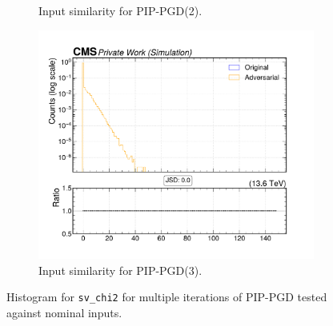 \begin{figure}[htbp]
\begin{subfigure}[t]{0.32\textwidth}
    \caption*{Input similarity for PIP-PGD(2).}
  \end{subfigure}\hfill
  \begin{subfigure}[t]{0.32\textwidth}
    \includegraphics[width=\linewidth]{media/output/features/compare/combined_it_3/cmp_vtx_arr_sv_chi2.pdf}
    \caption*{Input similarity for PIP-PGD(3).}
  \end{subfigure}

  \caption*{Histogram for \texttt{sv\_chi2} for multiple iterations of PIP-PGD tested against nominal inputs.}
  \label{fig:combined_input_sv_chi2}
\end{figure}

